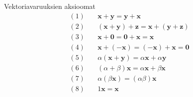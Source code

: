 Vektoriavaruuksien aksioomat \cite[s. 8]{MAT-60000}
\begin{align*}
(1)	\quad & \bm{x} + \bm{y} = \bm{y} + \bm{x} \\
(2)	\quad & (\bm{x} + \bm{y}) + \bm{z} = \bm{x} + (\bm{y} + \bm{z}) \\
(3)	\quad & \bm{x} + \bm{0} = \bm{0} + \bm{x} = \bm{x} \\
(4) \quad & \bm{x} + (-\bm{x}) = (-\bm{x}) + \bm{x} = \bm{0} \\
(5) \quad & \alpha ( \bm{x} + \bm{y} ) = \alpha \bm{x} + \alpha \bm{y} \\
(6) \quad & (\alpha + \beta ) \bm{x} = \alpha \bm{x} + \beta \bm{x} \\
(7) \quad & \alpha ( \beta \bm{x} ) = (\alpha \beta) \bm{x} \\
(8) \quad & 1 \bm{x} = \bm{x}
\end{align*}

